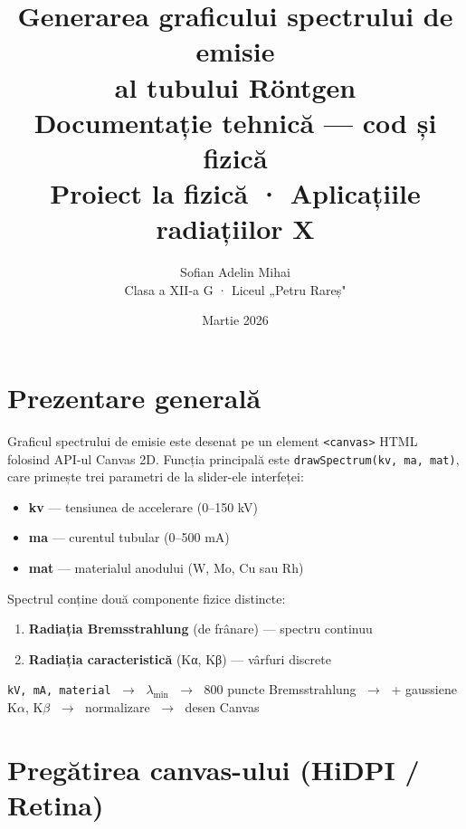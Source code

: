 \documentclass[12pt,a4paper]{article}
\title{
    \vspace{-1cm}
    {\LARGE\bfseries Generarea graficului spectrului de emisie\\al tubului Röntgen}\\[0.5em]
    {\large Documentație tehnică — cod și fizică}\\[1em]
    {\normalsize Proiect la fizică · Aplicațiile radiațiilor X}
}
\author{Sofian Adelin Mihai \\ Clasa a XII-a G · Liceul „Petru Rareș"}
\date{Martie 2026}
\begin{document}
\maketitle
\thispagestyle{fancy}

\tableofcontents
\newpage

\section{Prezentare generală}

Graficul spectrului de emisie este desenat pe un element \texttt{<canvas>} HTML folosind API-ul Canvas 2D. Funcția principală este \texttt{drawSpectrum(kv, ma, mat)}, care primește trei parametri de la slider-ele interfeței:

\begin{itemize}[leftmargin=2em]
    \item \textbf{kv} — tensiunea de accelerare (0–150 kV)
    \item \textbf{ma} — curentul tubular (0–500 mA)
    \item \textbf{mat} — materialul anodului (W, Mo, Cu sau Rh)
\end{itemize}

Spectrul conține două componente fizice distincte:
\begin{enumerate}
    \item \textbf{Radiația Bremsstrahlung} (de frânare) — spectru continuu
    \item \textbf{Radiația caracteristică} (Kα, Kβ) — vârfuri discrete
\end{enumerate}

\begin{tcolorbox}[colback=codeblue!5, colframe=codeblue, title=Fluxul de date]
\centering
\texttt{kV, mA, material} $\;\longrightarrow\;$ $\lambda_{\min}$ $\;\longrightarrow\;$ 800 puncte Bremsstrahlung $\;\longrightarrow\;$ + gaussiene K$\alpha$, K$\beta$ $\;\longrightarrow\;$ normalizare $\;\longrightarrow\;$ desen Canvas
\end{tcolorbox}


\section{Pregătirea canvas-ului (HiDPI / Retina)}
\end{document}
